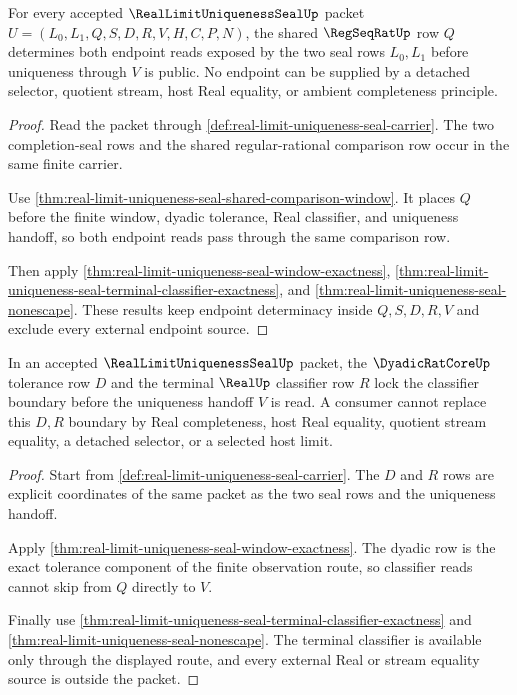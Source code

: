 \begin{theorem}
\label{thm:real-limit-uniqueness-seal-regseqrat-endpoint-determinacy}
For every accepted $\RealLimitUniquenessSealUp$ packet $U=(L_0,L_1,Q,S,D,R,V,H,C,P,N)$, the shared $\RegSeqRatUp$ row $Q$ determines both endpoint reads exposed by the two seal rows $L_0,L_1$ before uniqueness through $V$ is public. No endpoint can be supplied by a detached selector, quotient stream, host Real equality, or ambient completeness principle.
\end{theorem}
\begin{proof}
Read the packet through \autoref{def:real-limit-uniqueness-seal-carrier}. The two completion-seal rows and the shared regular-rational comparison row occur in the same finite carrier.

Use \autoref{thm:real-limit-uniqueness-seal-shared-comparison-window}. It places $Q$ before the finite window, dyadic tolerance, Real classifier, and uniqueness handoff, so both endpoint reads pass through the same comparison row.

Then apply \autoref{thm:real-limit-uniqueness-seal-window-exactness}, \autoref{thm:real-limit-uniqueness-seal-terminal-classifier-exactness}, and \autoref{thm:real-limit-uniqueness-seal-nonescape}. These results keep endpoint determinacy inside $Q,S,D,R,V$ and exclude every external endpoint source.
\end{proof}

\begin{theorem}
\label{thm:real-limit-uniqueness-seal-dyadic-real-classifier-lock}
In an accepted $\RealLimitUniquenessSealUp$ packet, the $\DyadicRatCoreUp$ tolerance row $D$ and the terminal $\RealUp$ classifier row $R$ lock the classifier boundary before the uniqueness handoff $V$ is read. A consumer cannot replace this $D,R$ boundary by Real completeness, host Real equality, quotient stream equality, a detached selector, or a selected host limit.
\end{theorem}
\begin{proof}
Start from \autoref{def:real-limit-uniqueness-seal-carrier}. The $D$ and $R$ rows are explicit coordinates of the same packet as the two seal rows and the uniqueness handoff.

Apply \autoref{thm:real-limit-uniqueness-seal-window-exactness}. The dyadic row is the exact tolerance component of the finite observation route, so classifier reads cannot skip from $Q$ directly to $V$.

Finally use \autoref{thm:real-limit-uniqueness-seal-terminal-classifier-exactness} and \autoref{thm:real-limit-uniqueness-seal-nonescape}. The terminal classifier is available only through the displayed route, and every external Real or stream equality source is outside the packet.
\end{proof}

